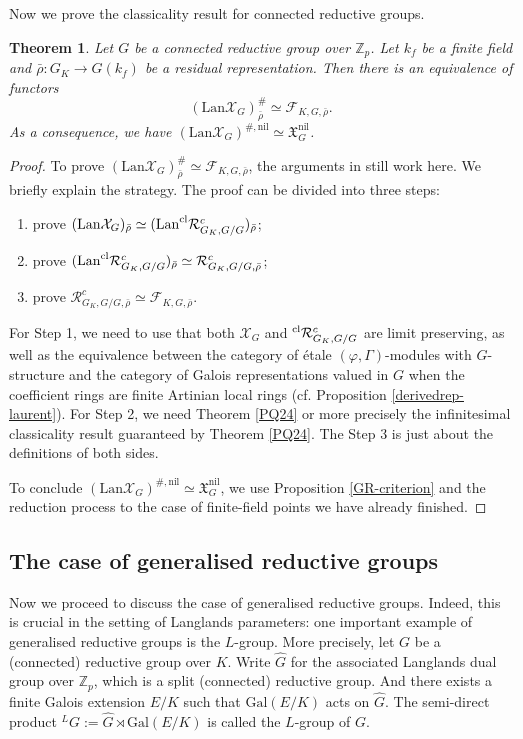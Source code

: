 \documentclass[10pt]{article}
\newtheorem{thm}{Theorem}[section]
\numberwithin{equation}{section}
\newcommand{\frakX}{{\mathfrak X}}
\newcommand{\bZ}{{\mathbb Z}}
\newcommand{\calF}{{\mathcal F}}
\newcommand{\calR}{{\mathcal R}}
\newcommand{\calX}{{\mathcal X}}
\newcommand{\Gal}{{\mathrm{Gal}}}           %
\newcommand{\Lan}{{\mathrm{Lan}}}
\newcommand{\nil}{\mathrm{nil}}
\begin{document}
Now we prove the classicality result for connected reductive groups.

\begin{thm}\label{main-connected}
Let $G$ be a connected reductive group over $\bZ_p$. Let $k_f$ be a finite field and  $\bar\rho:G_K\to G(k_f)$ be a residual representation. Then there is an equivalence of functors
    \[
    (\Lan\calX_{G})^{\#}_{\bar \rho}\simeq\calF_{K,G,\bar\rho}.
    \]
    As a consequence, we have $(\Lan\calX_{G})^{\#,\nil}\simeq \frakX_G^{\nil}$.
\end{thm}
\begin{proof}
    To prove $(\Lan\calX_{G})^{\#}_{\bar \rho}\simeq\calF_{K,G,\bar\rho}$, the arguments in \cite[Proposition 3.51]{Min23} still work here. We briefly explain the strategy. The proof can be divided into three steps:
\begin{enumerate}
    \item prove $(\Lan\calX_{G})_{\bar \rho}\simeq (\Lan ^{\rm cl}\calR_{G_K,G/G}^{c})_{\bar \rho}$;
    \item prove $(\Lan^{\rm cl}\calR_{G_K,G/G}^{c})_{\bar \rho}\simeq\calR_{G_K,G/G,\bar\rho}^{c}$;
    \item prove $\calR_{G_K,G/G,\bar\rho}^{c}\simeq \calF_{K,G,\bar\rho}$.
\end{enumerate}
For Step 1, we need to use that both $\calX_G$ and $^{\rm cl}\calR_{G_K,G/G}^{c}$ are limit preserving, as well as the equivalence between the category of \'etale $(\varphi,\Gamma)$-modules with $G$-structure and the category of Galois representations valued in $G$ when the coefficient rings are finite Artinian local rings (cf. Proposition \ref{derivedrep-laurent}). For Step 2, we need Theorem \ref{PQ24} or more precisely the infinitesimal classicality result guaranteed by Theorem \ref{PQ24}. The Step 3 is just about the definitions of both sides.

To conclude $(\Lan\calX_{G})^{\#,\nil}\simeq \frakX_G^{\nil}$, we use Proposition \ref{GR-criterion} and the reduction process to the case of finite-field points we have already finished.
\end{proof}



\subsection{The case of generalised reductive groups}
Now we proceed to discuss the case of generalised reductive groups. Indeed, this is crucial in the setting of Langlands parameters: one important example of generalised reductive groups is the $L$-group. More precisely, let $G$ be a (connected) reductive group over $K$. Write $\widehat G$ for the associated Langlands dual group over $\bZ_p$, which is a split (connected) reductive group. And there exists a finite Galois extension $E/K$ such that $\Gal(E/K)$ acts on $\hat G$. The semi-direct product $^LG:=\widehat G\rtimes \Gal(E/K)$ is called the $L$-group of $G$.
\end{document}
